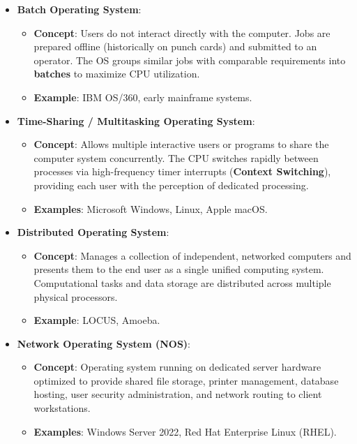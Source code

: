 \begin{itemize}[leftmargin=1.5em]
    \item \textbf{Batch Operating System}:
    \begin{itemize}
        \item \textbf{Concept}: Users do not interact directly with the computer. Jobs are prepared offline (historically on punch cards) and submitted to an operator. The OS groups similar jobs with comparable requirements into \textbf{batches} to maximize CPU utilization.
        \item \textbf{Example}: IBM OS/360, early mainframe systems.
    \end{itemize}

    \item \textbf{Time-Sharing / Multitasking Operating System}:
    \begin{itemize}
        \item \textbf{Concept}: Allows multiple interactive users or programs to share the computer system concurrently. The CPU switches rapidly between processes via high-frequency timer interrupts (\textbf{Context Switching}), providing each user with the perception of dedicated processing.
        \item \textbf{Examples}: Microsoft Windows, Linux, Apple macOS.
    \end{itemize}

    \item \textbf{Distributed Operating System}:
    \begin{itemize}
        \item \textbf{Concept}: Manages a collection of independent, networked computers and presents them to the end user as a single unified computing system. Computational tasks and data storage are distributed across multiple physical processors.
        \item \textbf{Example}: LOCUS, Amoeba.
    \end{itemize}

    \item \textbf{Network Operating System (NOS)}:
    \begin{itemize}
        \item \textbf{Concept}: Operating system running on dedicated server hardware optimized to provide shared file storage, printer management, database hosting, user security administration, and network routing to client workstations.
        \item \textbf{Examples}: Windows Server 2022, Red Hat Enterprise Linux (RHEL).
    \end{itemize}


\end{itemize}
